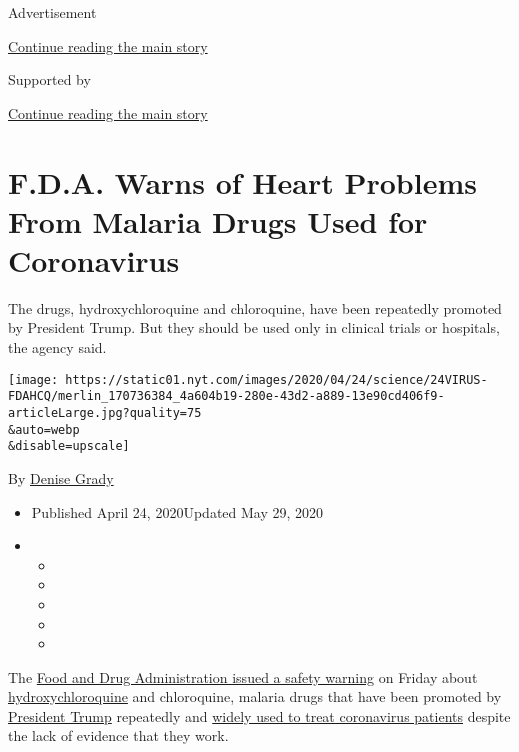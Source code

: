 Advertisement

\protect\hyperlink{after-top}{Continue reading the main story}

Supported by

\protect\hyperlink{after-sponsor}{Continue reading the main story}

\hypertarget{fda-warns-of-heart-problems-from-malaria-drugs-used-for-coronavirus}{%
\section{F.D.A. Warns of Heart Problems From Malaria Drugs Used for
Coronavirus}\label{fda-warns-of-heart-problems-from-malaria-drugs-used-for-coronavirus}}

The drugs, hydroxychloroquine and chloroquine, have been repeatedly
promoted by President Trump. But they should be used only in clinical
trials or hospitals, the agency said.

\texttt{[image: https://static01.nyt.com/images/2020/04/24/science/24VIRUS-FDAHCQ/merlin\_170736384\_4a604b19-280e-43d2-a889-13e90cd406f9-articleLarge.jpg?quality=75\\\&auto=webp\\\&disable=upscale]}

By \href{https://www.nytimes.com/by/denise-grady}{Denise Grady}

\begin{itemize}
\item
  Published April 24, 2020Updated May 29, 2020
\item
  \begin{itemize}
  \item
  \item
  \item
  \item
  \item
  \end{itemize}
\end{itemize}

The \href{https://www.fda.gov/media/137250/download}{Food and Drug
Administration issued a safety warning} on Friday about
\href{https://www.nytimes.com/2020/05/29/health/coronavirus-hydroxychloroquine.html}{hydroxychloroquine}
and chloroquine, malaria drugs that have been promoted by
\href{https://www.nytimes.com/2020/05/19/us/politics/hydroxychloroquine-trump-coronavirus.html}{President
Trump} repeatedly and
\href{https://www.nytimes.com/2020/04/01/health/hydroxychloroquine-coronavirus-malaria.html}{widely
used to treat coronavirus patients} despite the lack of evidence that
they work.

